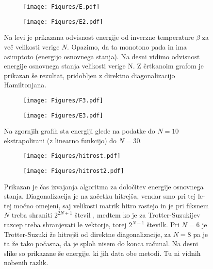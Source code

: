 \documentclass{article}
\begin{document}
\begin{figure}[H]
\centering
\begin{subfigure}{.49\textwidth}
\texttt{[image: Figures/E.pdf]}
\end{subfigure}
\begin{subfigure}{.49\textwidth}
\texttt{[image: Figures/E2.pdf]}
\end{subfigure}
\caption*{Na levi je prikazana odvisnost energije od inverzne temperature $\beta$ za več velikosti verige $N$. Opazimo, da ta monotono pada in ima asimptoto (energijo osnovnega stanja). Na desni vidimo odvisnost energije osnovnega stanja velikosti verige N. Z črtkanoim grafom je prikazan še rezultat, pridobljen z direktno diagonalizacijo Hamiltonjana.}
\end{figure}

\begin{figure}[H]
\centering
\begin{subfigure}{.49\textwidth}
\texttt{[image: Figures/F3.pdf]}
\end{subfigure}
\begin{subfigure}{.49\textwidth}
\texttt{[image: Figures/E3.pdf]}
\end{subfigure}
\caption*{Na zgornjih grafih sta energiji glede na podatke do $N=10$ ekstrapolirani (z linearno funkcijo) do $N=30$.}
\end{figure}

\begin{figure}[H]
\centering
\begin{subfigure}{.49\textwidth}
\texttt{[image: Figures/hitrost.pdf]}
\end{subfigure}
\begin{subfigure}{.49\textwidth}
\texttt{[image: Figures/hitrost2.pdf]}
\end{subfigure}
\caption*{Prikazan je čas izvajanja algoritma za določitev energije osnovnega stanja. Diagonalizacija je na začetku hitrejša, vendar smo pri tej le-tej močno omejeni, saj velikosti matrik hitro rastejo in je pri fiksnem $N$ treba shraniti $2^{2N+1}$ števil , medtem ko je za Trotter-Suzukijev razcep treba shranjevati le vektorje, torej $2^{N+1}$ številk. Pri $N=6$ je Trotter-Suzuki že hitrejši od direktne diagonalizacije, za $N=8$ pa je ta že tako počasna, da je sploh nisem do konca računal. Na desni slike so prikazane še energije, ki jih data obe metodi. Tu ni vidnih nobenih razlik.}
\end{figure}
\end{document}
